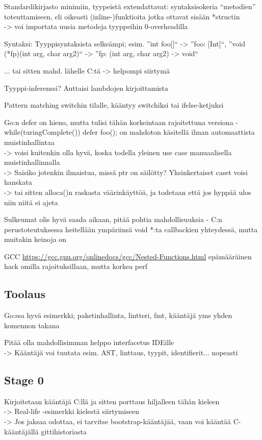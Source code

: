 Standardikirjasto minimiin, tyypeistä extendattavat: syntaksisokeria
``metodien'' toteuttamiseen, eli oikeasti (inline-)funktioita jotka ottavat
sisään *structin \\
-> voi importata uusia metodeja tyyppeihin 0-overheadilla

Syntaksi: Tyyppisyntaksista selkeämpi; esim. ''int foo[]`` -> ''foo: [Int]``,
''void (*fp)(int arg, char arg2)`` -> ''fp: (int arg, char arg2) -> void``

... tai sitten mahd. lähelle C:tä -> helpompi siirtymä

Tyyppi-inferenssi? Auttaisi lambdojen kirjoittamista

Pattern matching switchin tilalle, kääntyy switchiksi tai ifelse-ketjuksi

Go:n defer on hieno, mutta tulisi tähän korkeintaan rajoitettuna versiona -
while(turingComplete()) defer foo(); on mahdoton käsitellä ilman automaattista
muistinhallintaa \\
-> voisi kuitenkin olla hyvä, koska todella yleinen use case manuaalisella
muistinhallinnalla \\
-> Saisiko jotenkin ilmaistua, missä ptr on säilötty? Yksinkertaiset caset
voisi hanskata \\
-> tai sitten alloca()n raskasta väärinkäyttöä, ja todetaan että jos hyppää
ulos niin niitä ei ajeta

Sulkeumat olis hyvä saada aikaan, pitää pohtia mahdollisuuksia - C:n
perustoteutuksessa heitellään ympäriinsä void *:ta callbackien yhteydessä,
mutta muitakin keinoja on

GCC \url{https://gcc.gnu.org/onlinedocs/gcc/Nested-Functions.html} epämääräinen
hack omilla rajoituksillaan, mutta korkea perf

\subsection{Toolaus}

Go:ssa hyvä esimerkki; paketinhallinta, lintteri, fmt, kääntäjä yms yhden
komennon takana

Pitää olla mahdollisimman helppo interfacetus IDEille \\
-> Kääntäjä voi tuutata esim. AST, linttaus, tyypit, identifierit... nopeasti

\subsection{Stage 0}

Kirjoitetaan kääntäjä C:llä ja sitten porttaus hiljalleen tähän kieleen \\
-> Real-life -esimerkki kielestä siirtymiseen \\
-> Jos jaksaa odottaa, ei tarvitse bootstrap-kääntäjää, vaan voi kääntää
C-kääntäjällä gittihistoriasta 
